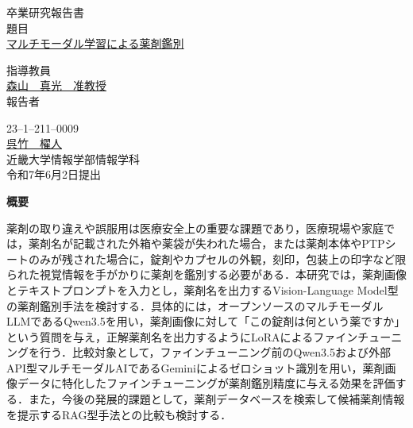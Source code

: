 \documentclass{jsarticle}
\begin{document}
\pagestyle{empty}

\begin{center}
\vspace*{1cm}
\large
{\LARGE 卒業研究報告書}\\
\vspace*{0.8cm}
題目\\
\vspace*{1cm}
{\Huge \underline{マルチモーダル学習による薬剤鑑別}}\\
\vspace{3mm}

\vspace*{3cm}
指導教員\\
\vspace*{0.3cm}
\underline{\LARGE 森山　真光　准教授}\\
\vspace*{3cm}
報告者\\
\vspace*{0.3cm}

{23--1--211--0009}\\
\vspace*{0.3cm}
\underline{\Huge 呉竹　櫂人}\\
\vspace*{0.5cm}
近畿大学情報学部情報学科\\
\vspace*{2cm}
令和7年6月2日提出\\
\end{center}

\newpage
\normalsize

\clearpage
\begin{center}
{\bf \Large 概要}
\end{center}

薬剤の取り違えや誤服用は医療安全上の重要な課題であり，医療現場や家庭では，薬剤名が記載された外箱や薬袋が失われた場合，または薬剤本体やPTPシートのみが残された場合に，錠剤やカプセルの外観，刻印，包装上の印字など限られた視覚情報を手がかりに薬剤を鑑別する必要がある．本研究では，薬剤画像とテキストプロンプトを入力とし，薬剤名を出力するVision-Language Model型の薬剤鑑別手法を検討する．具体的には，オープンソースのマルチモーダルLLMであるQwen3.5を用い，薬剤画像に対して「この錠剤は何という薬ですか」という質問を与え，正解薬剤名を出力するようにLoRAによるファインチューニングを行う．比較対象として，ファインチューニング前のQwen3.5および外部API型マルチモーダルAIであるGeminiによるゼロショット識別を用い，薬剤画像データに特化したファインチューニングが薬剤鑑別精度に与える効果を評価する．また，今後の発展的課題として，薬剤データベースを検索して候補薬剤情報を提示するRAG型手法との比較も検討する．
\end{document}
